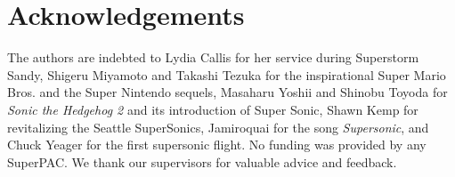 \section*{Acknowledgements}

The authors are indebted to Lydia Callis for her service during Superstorm Sandy, Shigeru Miyamoto and Takashi Tezuka for the inspirational Super Mario Bros.\cite{mario} and the Super Nintendo sequels, Masaharu Yoshii and Shinobu Toyoda for \textit{Sonic the Hedgehog 2}\cite{sonic2} and its introduction of Super Sonic, Shawn Kemp for revitalizing the Seattle SuperSonics, Jamiroquai for the song \emph{Supersonic}, and Chuck Yeager for the first supersonic flight.
No funding was provided by any SuperPAC.
We thank our supervisors for valuable advice and feedback.